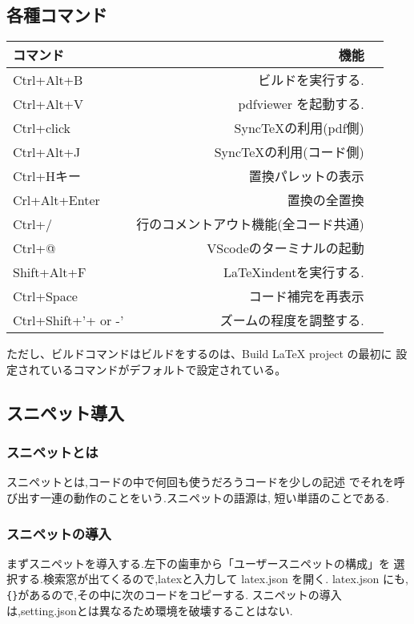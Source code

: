 \documentclass{ltjsarticle}
\begin{document}
\subsection{各種コマンド}
\begin{center}
  \begin{tabular}{lrr} \hline
    コマンド            & 機能                  \\ \hline
    Ctrl+Alt+B          & ビルドを実行する.           \\
    Ctrl+Alt+V          & pdfviewer を起動する.    \\
    Ctrl+click          & SyncTeXの利用(pdf側)    \\
    Ctrl+Alt+J          & SyncTeXの利用(コード側)    \\
    Ctrl+Hキー            & 置換パレットの表示           \\
    Crl+Alt+Enter       & 置換の全置換              \\
    Ctrl+/              & 行のコメントアウト機能(全コード共通) \\
    Ctrl+@              & VScodeのターミナルの起動     \\
    Shift+Alt+F         & LaTeXindentを実行する.\\
    Ctrl+Space          & コード補完を再表示\\
    Ctrl+Shift+'+ or -' & ズームの程度を調整する.        \\ \hline
  \end{tabular}
\end{center}
ただし、ビルドコマンドはビルドをするのは、Build LaTeX project の最初に
設定されているコマンドがデフォルトで設定されている。
\subsection{スニペット導入}
\subsubsection*{スニペットとは}
スニペットとは,コードの中で何回も使うだろうコードを少しの記述
でそれを呼び出す一連の動作のことをいう.スニペットの語源は,
短い単語のことである.
\subsubsection*{スニペットの導入}
まずスニペットを導入する.左下の歯車から「ユーザースニペットの構成」を
選択する.検索窓が出てくるので,latexと入力して latex.json を開く.
latex.json にも,\verb|{}|があるので,その中に次のコードをコピーする.
スニペットの導入は,setting.jsonとは異なるため環境を破壊することはない.
\end{document}
